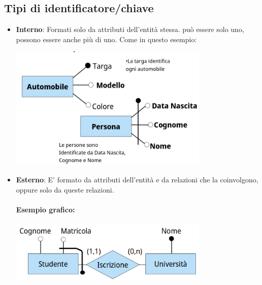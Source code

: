 \documentclass[12pt, a4paper, openany, twoside]{book}
\begin{document}
\subsection{Tipi di identificatore/chiave}
\begin{itemize}
	\item \textbf{Interno}: Formati solo da attributi dell'entità stessa. può 
	essere solo uno, possono essere anche più di uno. Come in questo esempio:
	\begin{center}
	\includegraphics[width=0.75\textwidth]{6.png}
	\end{center}

	\item \textbf{Esterno}: E' formato da attributi dell'entità e da relazioni
	che la coinvolgono, oppure solo da queste relazioni.
	\paragraph{Esempio grafico:}
	\begin{center}
	\includegraphics[width=0.75\textwidth]{7.png}
	\end{center}

\end{itemize}
\end{document}
